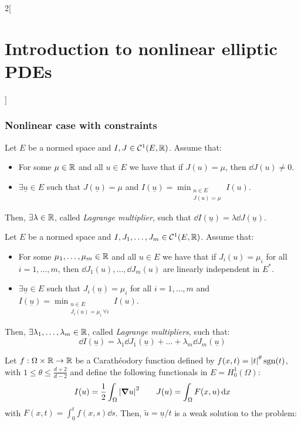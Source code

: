 \documentclass[../../../main_math.tex]{subfiles}
\begin{document}
\begin{multicols}{2}[\section{Introduction to nonlinear elliptic PDEs}]
  \subsubsection{Nonlinear case with constraints}
  \begin{theorem}
    Let $E$ be a normed space and $I,J\in \mathcal{C}^1(E,\mathbb{R})$. Assume that:
    \begin{itemize}
      \item For some $\mu\in\mathbb{R}$ and all $u\in E$ we have that if $J(u)=\mu$, then $\dd{J(u)}\ne0$.
      \item $\exists \underline{u}\in E$ such that $J(\underline{u})=\mu$ and $I(\underline{u})=\displaystyle \min_{\substack{u\in E \\ J(u)=\mu}}I(u)$.
    \end{itemize}
    Then, $\exists \lambda\in\mathbb{R}$, called \emph{Lagrange multiplier}, such that $\dd{I(\underline{u})}=\lambda \dd{J(\underline{u})}$.
  \end{theorem}
  \begin{theorem}
    Let $E$ be a normed space and $I,J_1,\dots,J_m\in \mathcal{C}^1(E,\mathbb{R})$. Assume that:
    \begin{itemize}
      \item For some $\mu_1,\dots,\mu_m\in\mathbb{R}$ and all $u\in E$ we have that if $J_i(u)=\mu_i$ for all $i=1,\dots,m$, then $\dd{J_1(u)}, \ldots, \dd{J_m(u)}$ are linearly independent in $E^*$.
      \item $\exists \underline{u}\in E$ such that $J_i(\underline{u})=\mu_i$ for all $i=1,\dots,m$ and $I(\underline{u})=\displaystyle \min_{\substack{u\in E \\ J_i(u)=\mu_i\  \forall i}}I(u)$.
    \end{itemize}
    Then, $\exists \lambda_1,\dots,\lambda_m\in\mathbb{R}$, called \emph{Lagrange multipliers}, such that: $$\dd{I(\underline{u})}=\lambda_1 \dd{J_1(\underline{u})}+\dots+\lambda_m \dd{J_m(\underline{u})}$$
  \end{theorem}
  \begin{proposition}[Aplication]\label{INEPDE:lagrange_apl}
    Let $f:\Omega\times \mathbb{R}\to\mathbb{R}$ be a Carathéodory function defined by $f(x,t)=\abs{t}^{\theta}\operatorname{sgn}(t)$, with $1\leq \theta\leq \frac{d+2}{d-2}$
    and define the following functionals in $E=H_0^1(\Omega)$:
    $$
      I(u)=\frac{1}{2}\int_\Omega \abs{\grad u}^2\qquad J(u)=\int_\Omega F(x,u)\dd{x}
    $$
    with $F(x,t)=\int_0^t f(x,s)\dd{s}$. Then, $\tilde{u}=\underline{u}/t$ is a weak solution to the problem:

\end{proposition}
\end{multicols}
\end{document}
